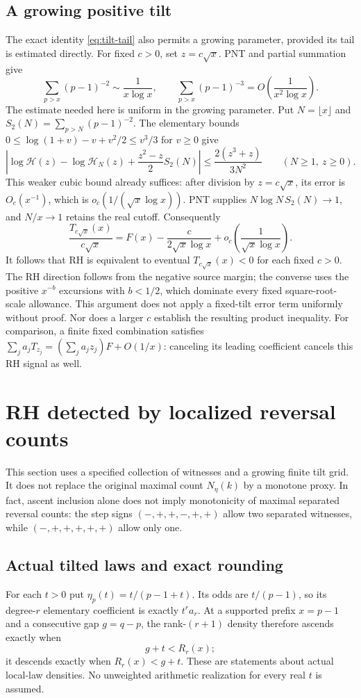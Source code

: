 \documentclass[11pt]{article}
\theoremstyle{definition}
\begin{document}
\subsection{A growing positive tilt}
The exact identity \eqref{eq:tilt-tail} also permits a growing
parameter, provided its tail is estimated directly.
For fixed $c>0$, set $z=c\sqrt{x}$. PNT and partial summation give
\[
 \sum_{p>x}(p-1)^{-2}\sim\frac1{x\log x},\qquad
 \sum_{p>x}(p-1)^{-3}=O\left(\frac1{x^2\log x}\right).
\]
The estimate needed here is uniform in the growing parameter. Put
$N=\lfloor x\rfloor$ and $S_2(N)=\sum_{p>N}(p-1)^{-2}$. The elementary
bounds $0\le\log(1+v)-v+v^2/2\le v^3/3$ for $v\ge0$ give
\[
 \left|\log\mathcal H(z)-\log\mathcal H_N(z)
       +\frac{z^2-z}{2}S_2(N)\right|
 \le\frac{2(z^3+z)}{3N^2}\qquad(N\ge1,\ z\ge0).
\]
This weaker cubic bound already suffices: after division by
$z=c\sqrt{x}$, its error is $O_c(x^{-1})$, which is
$o_c(1/(\sqrt{x}\log x))$. PNT supplies
$N\log N\,S_2(N)\to1$, and $N/x\to1$ retains the real cutoff.
Consequently
\begin{equation}\label{eq:growing-tilt}
 \frac{T_{c\sqrt{x}}(x)}{c\sqrt{x}}
 =F(x)-\frac{c}{2\sqrt{x}\log x}
       +o_c\left(\frac1{\sqrt{x}\log x}\right).
\end{equation}
It follows that RH is equivalent to eventual
$T_{c\sqrt{x}}(x)<0$ for each fixed $c>0$.
The RH direction follows from the negative source margin; the converse
uses the positive $x^{-b}$ excursions with $b<1/2$, which dominate
every fixed square-root-scale allowance.
This argument does not apply a fixed-tilt error term uniformly without
proof. Nor does a larger $c$ establish the resulting product inequality.
For comparison, a finite fixed combination satisfies
$\sum_j a_jT_{z_j}=(\sum_j a_jz_j)F+O(1/x)$:
canceling its leading coefficient cancels this RH signal as well.

\section{RH detected by localized reversal counts}\label{sec:local-count}
This section uses a specified collection of witnesses and a growing
finite tilt grid. It does not replace the original maximal count
$N_\eta(k)$ by a monotone proxy. In fact, ascent inclusion alone does
not imply monotonicity of maximal separated reversal counts: the step
signs $(-,+,+,-,+,+)$ allow two separated witnesses, while
$(-,+,+,+,+,+)$ allow only one.

\subsection{Actual tilted laws and exact rounding}
For each $t>0$ put $\eta_p(t)=t/(p-1+t)$. Its odds are
$t/(p-1)$, so its degree-$r$ elementary coefficient is exactly
$t^r a_r$. At a supported prefix $x=p-1$ and a consecutive
gap $g=q-p$, the rank-$(r+1)$ density therefore ascends exactly when
\[
 g+t<R_r(x);
\]
it descends exactly when $R_r(x)<g+t$.
These are statements about actual local-law densities.
No unweighted arithmetic realization for every real $t$ is assumed.
\end{document}
